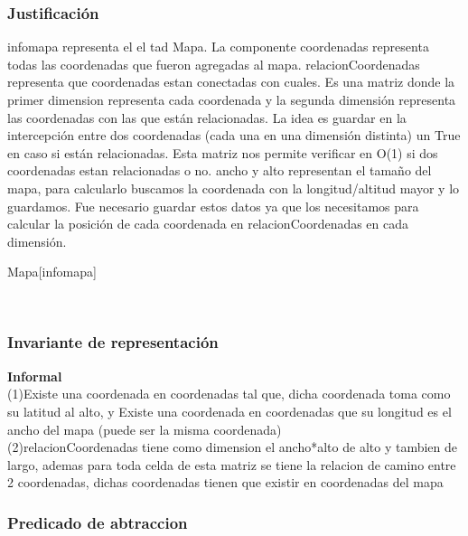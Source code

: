 \begin{Representacion}
\subsubsection{Justificación}
infomapa representa el el tad Mapa. La componente coordenadas representa todas las coordenadas que fueron agregadas al mapa.
relacionCoordenadas representa que coordenadas estan conectadas con cuales. Es una matriz donde la primer dimension representa cada coordenada y la segunda dimensi\'on representa las coordenadas con las que est\'an relacionadas. La idea es guardar en la intercepci\'on entre dos coordenadas (cada una en una dimensi\'on distinta) un True en caso si están relacionadas. Esta matriz nos permite verificar en O(1) si dos coordenadas estan relacionadas o no.
ancho y alto representan el tama\~no del mapa, para calcularlo buscamos la coordenada con la longitud/altitud mayor y lo guardamos. Fue necesario guardar estos datos ya que los necesitamos para calcular la posici\'on de cada coordenada en relacionCoordenadas en cada dimensi\'on.

	\begin{Estructura}{Mapa}[infomapa]
		\begin{Tupla}[infomapa]
			\\
		\end{Tupla}
	\end{Estructura}

\subsubsection{Invariante de representación}

\textbf{Informal}\\
(1)Existe una coordenada en coordenadas tal que, dicha coordenada toma como su latitud al alto, y Existe una coordenada en coordenadas que su longitud es el ancho del mapa (puede ser la misma coordenada)\\
(2)relacionCoordenadas tiene como dimension el ancho*alto de alto y tambien de largo, ademas para toda celda de esta matriz se tiene la relacion de camino entre 2 coordenadas, dichas coordenadas tienen que existir en coordenadas del mapa 

\subsubsection{Predicado de abtraccion}

\end{Representacion}

